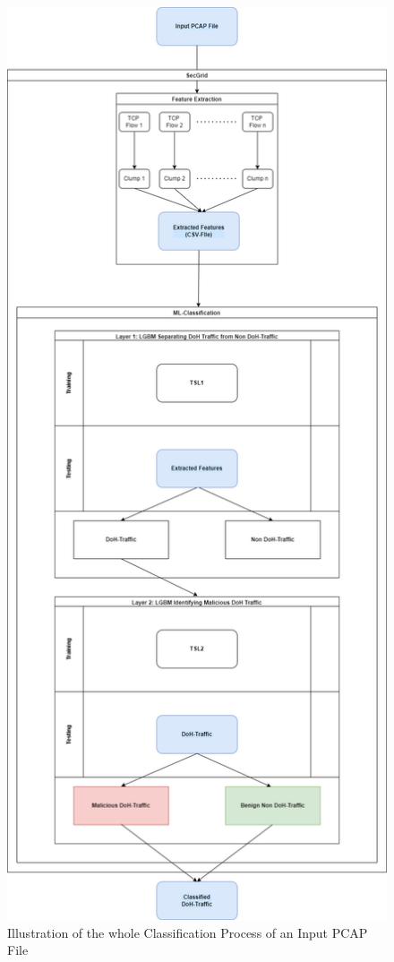 \begin{figure} [h]
\includegraphics[scale=0.34]{images/2_layers.png}
\centering
\caption{Illustration of the whole Classification Process of an Input PCAP File}
\label{fig:2_layers}
\end{figure}
